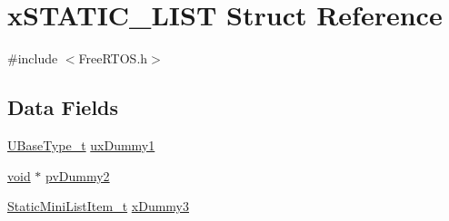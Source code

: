\hypertarget{structxSTATIC__LIST}{\section{x\-S\-T\-A\-T\-I\-C\-\_\-\-L\-I\-S\-T Struct Reference}
\label{structxSTATIC__LIST}
}


{\ttfamily \#include $<$Free\-R\-T\-O\-S.\-h$>$}

\subsection*{Data Fields}
\begin{DoxyCompactItemize}
\item 
\hyperlink{Flsh186_2prtmacro_8h_a8e88a5e44a5243b3d1c29af17fd6b5bd}{U\-Base\-Type\-\_\-t} \hyperlink{structxSTATIC__LIST_a6d7f720dc21e3a676b885b72a945fea7}{ux\-Dummy1}
\item 
\hyperlink{Paradigm_2Tern__EE_2small_2portmacro_8h_a14d32f8130d3c0b212cfc751730b5b49}{void} $\ast$ \hyperlink{structxSTATIC__LIST_a681e588716be5f49fe8e9eb73e8f280e}{pv\-Dummy2}
\item 
\hyperlink{FreeRTOS_8h_a9097f48f4dfa56e8e01d9179462c7994}{Static\-Mini\-List\-Item\-\_\-t} \hyperlink{structxSTATIC__LIST_a232545ebb5629617e0ee6ba286e37788}{x\-Dummy3}
\end{DoxyCompactItemize}



